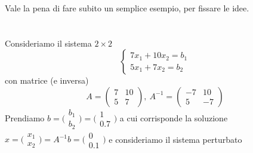 \documentclass[12pt,a4paper]{article}
\begin{document}
Vale la pena di fare subito un semplice esempio, per fissare le idee.\\\\
\textbf{} \\
Consideriamo il sistema $2\times 2$
\begin{equation*}
    \begin{cases}
        7x_1 + 10x_2 = b_1\\ 
        5x_1 + 7x_2 = b_2
    \end{cases}
\end{equation*}
con matrice (e inversa)
\begin{equation*}
    A=\begin{pmatrix}
        7 & 10 \\
        5 & 7
    \end{pmatrix}, \
    A^{-1}=\begin{pmatrix}
        -7 & 10 \\
        5 & -7 
    \end{pmatrix}
\end{equation*}
Prendiamo 
    $b=\bigl(\begin{smallmatrix}
    b_1 \\
    b_2
\end{smallmatrix}\bigr) = \bigl(\begin{smallmatrix}
    1 \\
    0.7
\end{smallmatrix}\bigr)$
     a cui corrisponde la soluzione $
x=\bigl(\begin{smallmatrix}
    x_1 \\
    x_2
\end{smallmatrix}\bigr) =A^{-1}b=\bigl(\begin{smallmatrix}
    0 \\
    0.1
\end{smallmatrix}\bigr)
$
 e consideriamo il sistema perturbato 
\end{document}
